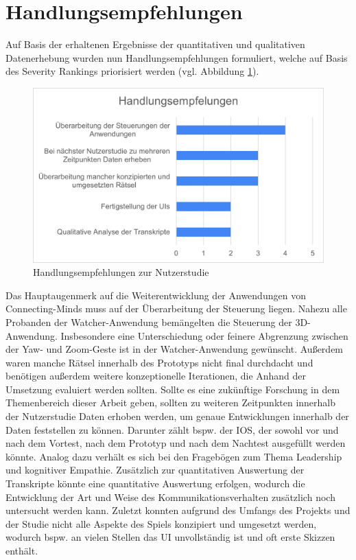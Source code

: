 \section{Handlungsempfehlungen}
Auf Basis der erhaltenen Ergebnisse der quantitativen und qualitativen Datenerhebung wurden nun Handlungsempfehlungen formuliert, welche auf Basis des Severity Rankings priorisiert werden (vgl. Abbildung \ref{fig:call_to_actions_user_study}).

\begin{figure}[ht]
\centering
\includegraphics[width=1\linewidth]{content/pictures/Handlungsempfehlung_Nutzerstudie.png}
\caption{Handlungsempfehlungen zur Nutzerstudie}
\label{fig:call_to_actions_user_study}
\end{figure}

Das Hauptaugenmerk auf die Weiterentwicklung der Anwendungen von Connecting-Minds muss auf der Überarbeitung der Steuerung liegen. Nahezu alle Probanden der Watcher-Anwendung bemängelten die Steuerung der 3D-Anwendung. Insbesondere eine Unterschiedung oder feinere Abgrenzung zwischen der Yaw- und Zoom-Geste ist in der Watcher-Anwendung gewünscht. Außerdem waren manche Rätsel innerhalb des Prototyps nicht final durchdacht und benötigen außerdem weitere konzeptionelle Iterationen, die Anhand der Umsetzung evaluiert werden sollten. 
Sollte es eine zukünftige Forschung in dem Themenbereich dieser Arbeit geben, sollten zu weiteren Zeitpunkten innerhalb der Nutzerstudie Daten erhoben werden, um genaue Entwicklungen innerhalb der Daten feststellen zu können. Darunter zählt bspw. der \ac{IOS}, der sowohl vor und nach dem Vortest, nach dem Prototyp und nach dem Nachtest ausgefüllt werden könnte. Analog dazu verhält es sich bei den Fragebögen zum Thema Leadership und kognitiver Empathie. 
Zusätzlich zur quantitativen Auswertung der Transkripte könnte eine quantitative Auswertung erfolgen, wodurch die Entwicklung der Art und Weise des Kommunikationsverhalten zusätzlich noch untersucht werden kann. Zuletzt konnten aufgrund des Umfangs des Projekts und der Studie nicht alle Aspekte des Spiels konzipiert und umgesetzt werden, wodurch bspw. an vielen Stellen das \ac{UI} unvollständig ist und oft erste Skizzen enthält.

